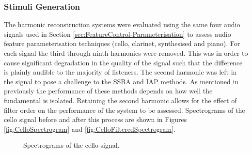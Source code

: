 		\subsubsection*{Stimuli Generation}
			The harmonic reconstruction systems were evaluated using the same four audio signals used in Section
			\ref{sec:FeatureControl-Parameterisation} to assess audio feature parameterisation techniques
			(cello, clarinet, synthesised and piano). For each signal the third through ninth harmonics were
			removed. This was in order to cause significant degradation in the quality of the signal such that
			the difference is plainly audible to the majority of listeners. The second harmonic was left in the
			signal to pose a challenge to the SSBA and IAP methods. As mentioned in previously the performance
			of these methods depends on how well the fundamental is isolated.  Retaining the second harmonic
			allows for the effect of filter order on the performance of the system to be assessed. Spectrograms
			of the cello signal before and after this process are shown in Figures \ref{fig:CelloSpectrogram}
			and \ref{fig:CelloFilteredSpectrogram}. 

			\begin{figure}[h!]
				\centering
				\quad
				\caption{Spectrograms of the cello signal.}
				\label{fig:CelloSpectrograms}
			\end{figure}

